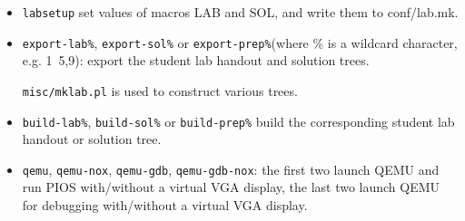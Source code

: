 \begin{itemize}
\begin{itemize}
\item \verb|labsetup| set values of macros LAB and SOL, and write them to conf/lab.mk.
\item \verb|export-lab%|, \verb|export-sol%| or \verb|export-prep%|(where \% is a wildcard character, e.g. 1~5,9): export the student lab handout and solution trees.

\verb|misc/mklab.pl| is used to construct various trees.
\item \verb|build-lab%|, \verb|build-sol%| or \verb|build-prep%| build the corresponding student lab handout or solution tree.
\item \verb|qemu|, \verb|qemu-nox|, \verb|qemu-gdb|, \verb|qemu-gdb-nox|: the first two launch QEMU and run PIOS with/without a virtual VGA display, the last two launch QEMU for debugging with/without a virtual VGA display.
\end{itemize}
\end{itemize}

